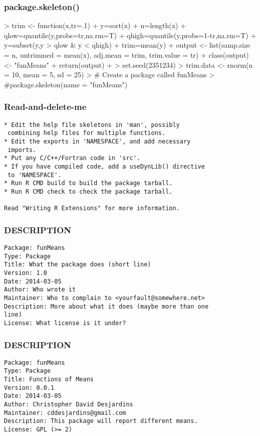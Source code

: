 \documentclass[xcolor=svgnames]{beamer}
\begin{document}
\begin{frame}[fragile]
  \frametitle{package.skeleton()}
\begin{Schunk}
\begin{Sinput}
> trim <- function(x,tr=.1){
+     y=sort(x)
+     n=length(x)
+     qlow=quantile(y,probs=tr,na.rm=T)
+     qhigh=quantile(y,probs=1-tr,na.rm=T)
+     y=subset(y,y > qlow & y < qhigh)
+     trim=mean(y)
+     output <- list(samp.size = n, untrimmed = mean(x), adj.mean = trim, trim.value = tr)
+     class(output) <- "funMeans"
+     return(output)
+ } 
> set.seed(2351234)
> trim.data <- rnorm(n = 10, mean = 5, sd = 25)                                   
> # Create a package called funMeans
> #package.skeleton(name = "funMeans")  
\end{Sinput}
\end{Schunk}

\end{frame}

\begin{frame}[fragile]
  \frametitle{Read-and-delete-me}
  \begin{verbatim}
* Edit the help file skeletons in 'man', possibly
 combining help files for multiple functions.
* Edit the exports in 'NAMESPACE', and add necessary
 imports.
* Put any C/C++/Fortran code in 'src'.
* If you have compiled code, add a useDynLib() directive
 to 'NAMESPACE'.
* Run R CMD build to build the package tarball.
* Run R CMD check to check the package tarball.

Read "Writing R Extensions" for more information.
\end{verbatim}
\end{frame}

\begin{frame}[fragile]
\frametitle{DESCRIPTION}
\begin{verbatim}
Package: funMeans
Type: Package
Title: What the package does (short line)
Version: 1.0
Date: 2014-03-05
Author: Who wrote it
Maintainer: Who to complain to <yourfault@somewhere.net>
Description: More about what it does (maybe more than one
line)
License: What license is it under?
\end{verbatim}
\end{frame}

\begin{frame}[fragile]
\frametitle{DESCRIPTION}
\begin{verbatim}
Package: funMeans
Type: Package
Title: Functions of Means
Version: 0.0.1
Date: 2014-03-05
Author: Christopher David Desjardins
Maintainer: cddesjardins@gmail.com
Description: This package will report different means.
License: GPL (>= 2)
\end{verbatim}
\end{frame}
\end{document}
